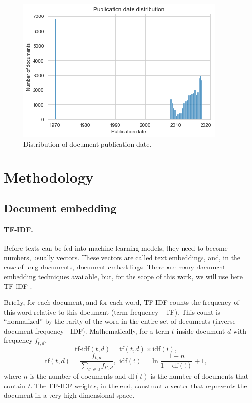 \documentclass[twocolumn]{article}
\begin{document}
                  \begin{figure}[!h]
                        \includegraphics[width=\linewidth]{dates.png}
                        \caption{Distribution of document publication date.}
                        \label{fig:dates}
                  \end{figure}

      \section{Methodology}
            \label{sec:methodology}

            \subsection{Document embedding}
                  \label{sec:document_embedding}

                  \paragraph{TF-IDF.} Before texts can be fed into machine learning models, they need to become numbers, usually vectors. These vectors are called text embeddings, and, in the case of long documents, document embeddings. There are many document embedding techniques available, but, for the scope of this work, we will use here TF-IDF \cite{robertson2004understanding}.

                  Briefly, for each document, and for each word, TF-IDF counts the frequency of this word relative to this document (term frequency - TF). This count is ``normalized'' by the rarity of the word in the entire set of documents (inverse document frequency - IDF). Mathematically, for a term $t$ inside document $d$ with frequency $f_{t, d}$,
                  \[\text{tf-idf}(t, d) = \text{tf}(t, d) \times \text{idf}(t),\]
                  \[\text{tf}(t, d) = \frac{f_{t, d}}{\sum_{t' \in d} f_{t', d}}, \ \ \text{idf}(t) = \ln \frac{1+n}{1+\text{df}(t)}+1,\]                  
                  where $n$ is the number of documents and $\text{df}(t)$ is the number of documents that contain $t$. The TF-IDF weights, in the end, construct a vector that represents the document in a very high dimensional space.
\end{document}
